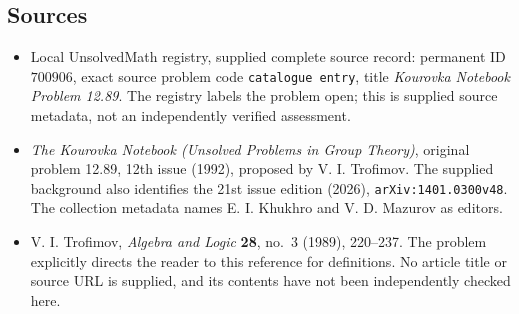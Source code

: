\documentclass[11pt]{article}
\begin{document}
\subsection{Sources}
\begin{itemize}
\item Local UnsolvedMath registry, supplied complete source record: permanent ID \(700906\), exact source problem code \texttt{catalogue entry}, title \emph{Kourovka Notebook Problem 12.89}. The registry labels the problem open; this is supplied source metadata, not an independently verified assessment.
\item \emph{The Kourovka Notebook (Unsolved Problems in Group Theory)}, original problem 12.89, 12th issue (1992), proposed by V. I. Trofimov. The supplied background also identifies the 21st issue edition (2026), \texttt{arXiv:1401.0300v48}. The collection metadata names E. I. Khukhro and V. D. Mazurov as editors.
\item V. I. Trofimov, \emph{Algebra and Logic} \textbf{28}, no.~3 (1989), 220--237. The problem explicitly directs the reader to this reference for definitions. No article title or source URL is supplied, and its contents have not been independently checked here.
\end{itemize}
\end{document}
